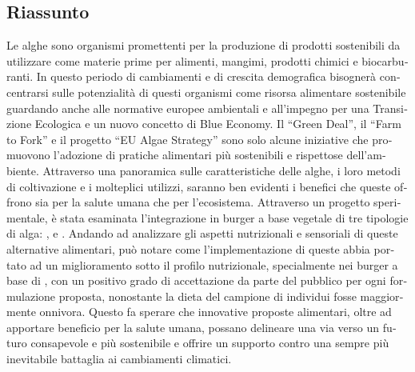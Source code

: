 \begin{otherlanguage}{italian}
\section*{Riassunto}
Le alghe sono organismi promettenti per la produzione di prodotti sostenibili da utilizzare come materie prime per alimenti, mangimi, prodotti chimici e biocarburanti. In questo periodo di cambiamenti e di crescita demografica bisognerà concentrarsi sulle potenzialità di questi organismi come risorsa alimentare sostenibile guardando anche alle normative europee ambientali e all'impegno per una Transizione Ecologica e un nuovo concetto di Blue Economy. Il “Green Deal”, il “Farm to Fork” e il progetto “EU Algae Strategy” sono solo alcune iniziative che promuovono l'adozione di pratiche alimentari più sostenibili e rispettose dell'ambiente. Attraverso una panoramica sulle caratteristiche delle alghe, i loro metodi di coltivazione e i molteplici utilizzi, saranno ben evidenti i benefici che queste offrono sia per la salute umana che per l'ecosistema. Attraverso un progetto sperimentale, è stata esaminata l'integrazione in burger a base vegetale di tre tipologie di alga: ,  e . Andando ad analizzare gli aspetti nutrizionali e sensoriali di queste alternative alimentari, può notare come l’implementazione di queste abbia portato ad un miglioramento sotto il profilo nutrizionale, specialmente nei burger a base di , con un positivo grado di accettazione da parte del pubblico per ogni formulazione proposta, nonostante la dieta del campione di individui fosse maggiormente onnivora. Questo fa sperare che innovative proposte alimentari, oltre ad apportare beneficio per la salute umana, possano delineare una via verso un futuro consapevole e più sostenibile e offrire un supporto contro una sempre più inevitabile battaglia ai cambiamenti climatici.
\end{otherlanguage}